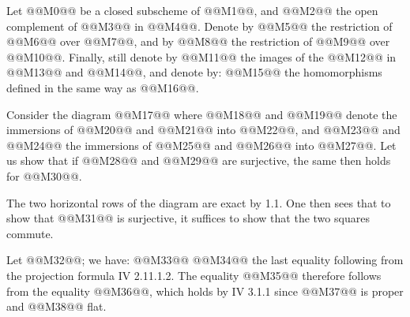 Let @@M0@@ be a closed subscheme of @@M1@@, and @@M2@@ the open complement of @@M3@@ in @@M4@@. Denote by @@M5@@ the restriction of @@M6@@ over @@M7@@, and by @@M8@@ the restriction of @@M9@@ over @@M10@@. Finally, still denote by @@M11@@ the images of the @@M12@@ in @@M13@@ and @@M14@@, and denote by:
@@M15@@
the homomorphisms defined in the same way as @@M16@@.

Consider the diagram
@@M17@@
where @@M18@@ and @@M19@@ denote the immersions of @@M20@@ and @@M21@@ into @@M22@@, and @@M23@@ and @@M24@@ the immersions of @@M25@@ and @@M26@@ into @@M27@@. Let us show that if @@M28@@ and @@M29@@ are surjective, the same then holds for @@M30@@.

The two horizontal rows of the diagram are exact by 1.1. One then sees that to show that @@M31@@ is surjective, it suffices to show that the two squares commute.

Let @@M32@@; we have:
@@M33@@
@@M34@@
the last equality following from the projection formula IV 2.11.1.2. The equality @@M35@@ therefore follows from the equality @@M36@@, which holds by IV 3.1.1 since @@M37@@ is
proper and @@M38@@ flat.
